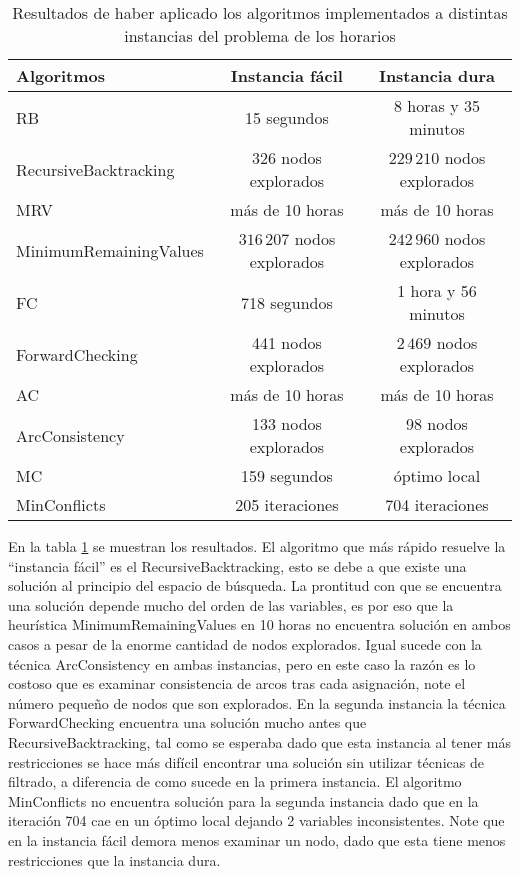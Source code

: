 \begin{table}[h]
	\caption{Resultados de haber aplicado los algoritmos implementados a distintas instancias del problema de los horarios}
	\begin{center}
		\label{1semana}
		\begin{tabular}{|l|c|c||}
			\hline \hline
			\textbf{Algoritmos} & \textbf{Instancia f\'acil} & \textbf{Instancia dura} \\ \hline
			RB & 15 segundos & 8 horas y 35 minutos \\
			{\tiny RecursiveBacktracking} & 326 nodos explorados & $229\,210$ nodos explorados \\ \hline
			MRV & m\'as de 10 horas &  m\'as de 10 horas \\
			{\tiny MinimumRemainingValues} & $316\,207$ nodos explorados & $242\,960$ nodos explorados \\ \hline
			FC & 718 segundos & 1 hora y 56 minutos \\
			{\tiny ForwardChecking} & 441 nodos explorados & $2\,469$ nodos explorados \\ \hline
			AC & m\'as de 10 horas &  m\'as de 10 horas \\
			{\tiny ArcConsistency} & 133 nodos explorados & 98 nodos explorados \\ \hline
			MC & 159 segundos & \'optimo local \\
			{\tiny MinConflicts} & 205 iteraciones & 704 iteraciones \\ \hline
		\end{tabular}
	\end{center}
\end{table}

En la tabla \ref{1semana} se muestran los resultados. El algoritmo que m\'as r\'apido resuelve la ``instancia f\'acil'' es el \textsf{RecursiveBacktracking}, esto se debe a que existe una soluci\'on al principio del espacio de b\'usqueda. La prontitud con que se encuentra una soluci\'on depende mucho del orden de las variables, es por eso que la heur\'istica \textsf{MinimumRemainingValues} en 10 horas no encuentra soluci\'on en ambos casos a pesar de la enorme cantidad de nodos explorados. Igual sucede con la t\'ecnica \textsf{ArcConsistency} en ambas instancias, pero en este caso la raz\'on es lo costoso que es examinar consistencia de arcos tras cada asignaci\'on, note el n\'umero pequeño de nodos que son explorados. En la segunda instancia la t\'ecnica \textsf{ForwardChecking} encuentra una soluci\'on mucho antes que \textsf{RecursiveBacktracking}, tal como se esperaba dado que esta instancia al tener m\'as restricciones se hace m\'as dif\'icil encontrar una soluci\'on sin utilizar t\'ecnicas de filtrado, a diferencia de como sucede en la primera instancia. El algoritmo \textsf{MinConflicts} no encuentra soluci\'on para la segunda instancia dado que en la iteraci\'on 704 cae en un \'optimo local dejando 2 variables inconsistentes. Note que en la instancia f\'acil demora menos examinar un nodo, dado que esta tiene menos restricciones que la instancia dura.

